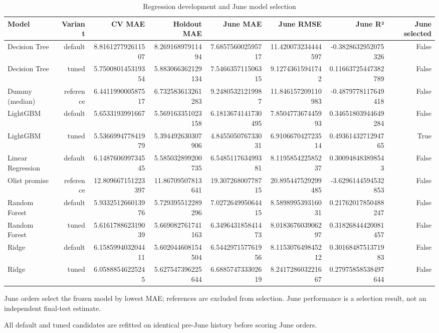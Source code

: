 \begin{table}[htbp]
\centering
\small
\caption{Regression development and June model selection}
\begin{tabular}{lrrrrrrr}
\toprule
Model & Variant & CV MAE & Holdout MAE & June MAE & June RMSE & June R² & June selected \\
\midrule
Decision Tree & default & 8.816127792611507 & 8.26916897911494 & 7.685756002595717 & 11.420073234444597 & -0.3828632952075326 & False \\
Decision Tree & tuned & 5.750080145319354 & 5.883066362129134 & 7.546635711506315 & 9.12743615941742 & 0.11663725447382789 & False \\
Dummy (median) & reference & 6.441199000587517 & 6.732583613261283 & 9.24805321219987 & 11.846157209110983 & -0.4879778117649418 & False \\
LightGBM & default & 5.6533193991667 & 5.569163351023158 & 6.1813674141730495 & 7.850477367445993 & 0.34651803944649284 & False \\
LightGBM & tuned & 5.536699477841979 & 5.394492630307906 & 4.845505076733031 & 6.910667042723514 & 0.4936143271294765 & True \\
Linear Regression & default & 6.148760699734545 & 5.585032899200735 & 6.548511763499381 & 8.119585422585237 & 0.300948483898543 & False \\
Olist promise & reference & 12.809667151223397 & 11.86709507813641 & 19.30726800778715 & 20.895447529299485 & -3.6296144594532853 & False \\
Random Forest & default & 5.933251266013976 & 5.729395512289296 & 7.027264995064415 & 8.589899539316031 & 0.21762017850488247 & False \\
Random Forest & tuned & 5.616178862319039 & 5.669082761741163 & 6.349643185841473 & 8.018367603906297 & 0.31826844420081457 & False \\
Ridge & default & 6.158599403204411 & 5.602044608154504 & 6.544297157761956 & 8.115307649845212 & 0.3016848751371983 & False \\
Ridge & tuned & 6.05888546225245 & 5.627547396225644 & 6.688574733302619 & 8.241728603221667 & 0.27975858538497644 & False \\
\bottomrule
\end{tabular}
\par\smallskip\begin{minipage}{\linewidth}\footnotesize June orders select the frozen model by lowest MAE; references are excluded from selection. June performance is a selection result, not an independent final-test estimate.\end{minipage}
\end{table}
All default and tuned candidates are refitted on identical pre-June history before scoring June orders.

